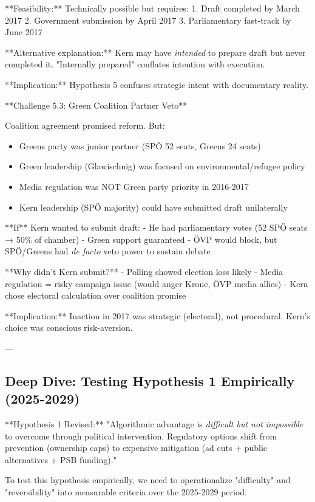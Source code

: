 **Feasibility:** Technically possible but requires:
1. Draft completed by March 2017
2. Government submission by April 2017
3. Parliamentary fast-track by June 2017

**Alternative explanation:** Kern may have \textit{intended} to prepare draft but never completed it. "Internally prepared" conflates intention with execution.

**Implication:** Hypothesis 5 confuses strategic intent with documentary reality.

**Challenge 5.3: Green Coalition Partner Veto**

Coalition agreement promised reform. But:
\begin{itemize}
\item Greens party was junior partner (SPÖ 52 seats, Greens 24 seats)
\item Green leadership (Glawischnig) was focused on environmental/refugee policy
\item Media regulation was NOT Green party priority in 2016-2017
\item Kern leadership (SPÖ majority) could have submitted draft unilaterally
\end{itemize}

**If** Kern wanted to submit draft:
- He had parliamentary votes (52 SPÖ seats → 50\% of chamber)
- Green support guaranteed
- ÖVP would block, but SPÖ/Greens had \textit{de facto} veto power to sustain debate

**Why didn't Kern submit?**
- Polling showed election loss likely
- Media regulation = risky campaign issue (would anger Krone, ÖVP media allies)
- Kern chose electoral calculation over coalition promise

**Implication:** Inaction in 2017 was strategic (electoral), not procedural. Kern's choice was conscious risk-aversion.

---

\subsection*{Deep Dive: Testing Hypothesis 1 Empirically (2025-2029)}

**Hypothesis 1 Revised:** "Algorithmic advantage is \textit{difficult but not impossible} to overcome through political intervention. Regulatory options shift from prevention (ownership caps) to expensive mitigation (ad cuts + public alternatives + PSB funding)."

To test this hypothesis empirically, we need to operationalize "difficulty" and "reversibility" into measurable criteria over the 2025-2029 period.

